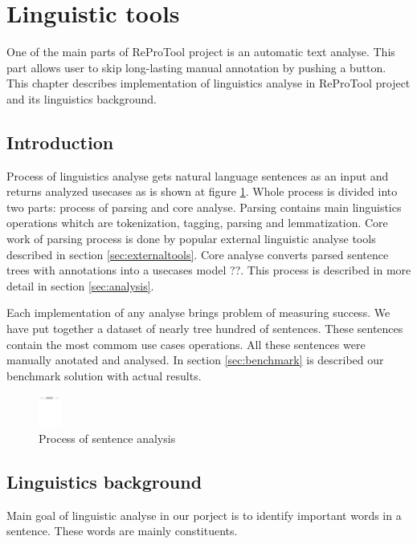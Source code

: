 \section{Linguistic tools}

One of the main parts of ReProTool project is an automatic text analyse. This part allows user to skip long-lasting manual annotation by pushing a button. This chapter describes implementation of linguistics analyse in ReProTool project and its linguistics background.

\subsection{Introduction}
Process of linguistics analyse gets natural language sentences as an input and returns analyzed usecases as is shown at figure \ref{fig:LinguisticsAnalyseSmall}. Whole process is divided into two parts: process of parsing and core analyse. Parsing contains main linguistics operations whitch are tokenization, tagging, parsing and lemmatization. Core work of parsing process is done by popular external linguistic analyse tools described in section \ref{sec:externaltools}. Core analyse converts parsed sentence trees with annotations into a usecases model ??. This process is described in more detail in section \ref{sec:analysis}. %

Each implementation of any analyse brings problem of measuring success. We have put together a dataset of nearly tree hundred of sentences. These sentences contain the most commom use cases operations. All these sentences were manually anotated and analysed. In section \ref{sec:benchmark} is described our benchmark solution with actual results.

\begin{figure}[h]
  \centering
  \includegraphics[height=30pt]{images/LinguisticsAnalyseSmall}
  \caption{Process of sentence analysis}
  \label{fig:LinguisticsAnalyseSmall}
\end{figure}

\subsection{Linguistics background}

Main goal of linguistic analyse in our porject is to identify important words in a sentence. These words are mainly constituents.


